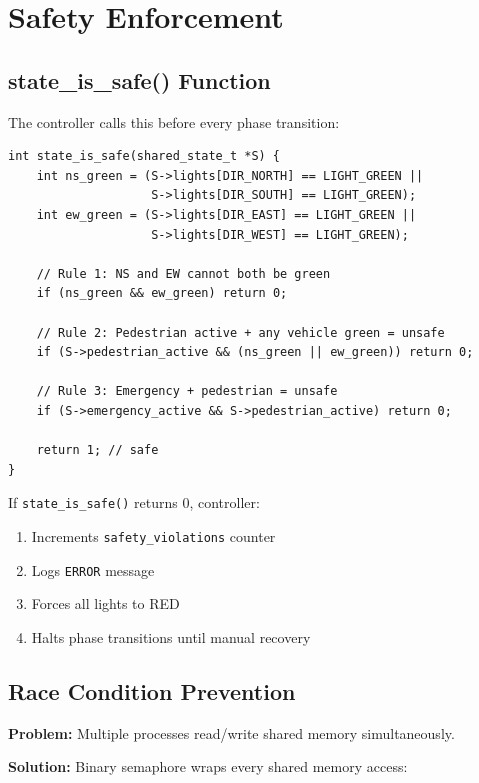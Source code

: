 \documentclass[11pt,a4paper]{article}
\begin{document}
\newpage
\section{Safety Enforcement}

\subsection{state\_is\_safe() Function}

The controller calls this before every phase transition:

\begin{lstlisting}[caption={Safety validation logic}]
int state_is_safe(shared_state_t *S) {
    int ns_green = (S->lights[DIR_NORTH] == LIGHT_GREEN ||
                    S->lights[DIR_SOUTH] == LIGHT_GREEN);
    int ew_green = (S->lights[DIR_EAST] == LIGHT_GREEN ||
                    S->lights[DIR_WEST] == LIGHT_GREEN);
    
    // Rule 1: NS and EW cannot both be green
    if (ns_green && ew_green) return 0;
    
    // Rule 2: Pedestrian active + any vehicle green = unsafe
    if (S->pedestrian_active && (ns_green || ew_green)) return 0;
    
    // Rule 3: Emergency + pedestrian = unsafe
    if (S->emergency_active && S->pedestrian_active) return 0;
    
    return 1; // safe
}
\end{lstlisting}

If \texttt{state\_is\_safe()} returns 0, controller:
\begin{enumerate}[noitemsep]
    \item Increments \texttt{safety\_violations} counter
    \item Logs \texttt{ERROR} message
    \item Forces all lights to RED
    \item Halts phase transitions until manual recovery
\end{enumerate}

\subsection{Race Condition Prevention}

\textbf{Problem:} Multiple processes read/write shared memory simultaneously.

\textbf{Solution:} Binary semaphore wraps every shared memory access:
\end{document}
